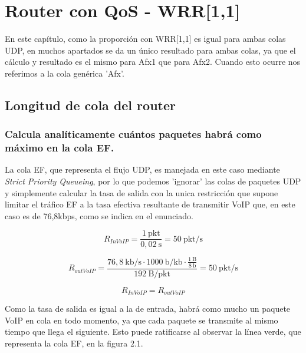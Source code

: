 \chapter{Router con QoS - WRR[1,1]}
\label{chap:conqoswrr11}

\tcolorbox[colback=yellow!20, colframe=yellow!50!black, title=Nota]
En este capítulo, como la proporción con WRR[1,1] es igual para ambas colas UDP, en muchos apartados
se da un único resultado para ambas colas, ya que el cálculo y resultado es el mismo para Afx1 que para 
Afx2. Cuando esto ocurre nos referimos a la cola genérica 'Afx'.
\endtcolorbox

\section{Longitud de cola del router}

\subsection{Calcula analíticamente cuántos paquetes habrá como máximo en la cola EF.}

\renewcommand{\theenumi}{\alph{enumi}}

La cola EF, que representa el flujo UDP, es manejada en este caso mediante \textit{Strict Priority Queueing},
por lo que podemos 'ignorar' las colas de paquetes UDP y simplemente calcular la tasa de salida con la
unica restricción que supone limitar el tráfico EF a la tasa efectiva resultante de transmitir VoIP que, 
en este caso es de 76,8kbps, como se indica en el enunciado.


\[
R_{InVoIP} = \frac{1~\text{pkt}}{0,02~\text{s}} = 50 ~ \text{pkt/s}
\]

\[
R_{outVoIP} = \frac{76,8~\text{kb/s} \cdot 1000~\text{b/kb} \cdot \frac{1~\text{B}}{8~\text{b}}}{ 192~\text{B/pkt}} = 50~\text{pkt/s}
\]

\[
R_{InVoIP} = R_{outVoIP}
\]

Como la tasa de salida es igual a la de entrada, habrá como mucho un paquete VoIP en
cola en todo momento, ya que cada paquete se transmite al mismo tiempo que llega el siguiente.
Esto puede ratificarse al observar la línea verde, que representa la cola EF, en la figura 2.1.

